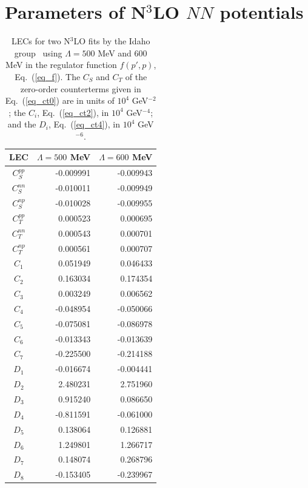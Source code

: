 \documentclass[sort&compress,preprint,3p]{elsarticle}
\begin{document}
\section{Parameters of N$^3$LO $NN$ potentials
\label{app_par}}

\setcounter{figure}{0}
\setcounter{table}{0}

\begin{table}[t]
\caption{LECs 
for two N$^3$LO fits by the Idaho group~\cite{EM03} using $\Lambda=500$ MeV
and 600 MeV in the regulator function $f(p',p)$, Eq.~(\ref{eq_f}).
The  $C_S$ and $C_T$ of the zero-order counterterms given in Eq.~(\ref{eq_ct0}) 
are in units of $10^4$ GeV$^{-2}$;
the $C_i$, Eq.~(\ref{eq_ct2}), in $10^4$ GeV$^{-4}$; 
and the $D_i$, Eq.~(\ref{eq_ct4}),
 in $10^4$ GeV$^{-6}$.
 \label{tab_LEC_ct1}}
 \smallskip
\begin{tabular*}{\textwidth}{@{\extracolsep{\fill}}crr}
\hline 
\hline 
\noalign{\smallskip}
 LEC & $\Lambda = 500$ MeV & $\Lambda =600$ MeV 
 \\
 \hline
  $C_S^{pp}$ & -0.009991  &  -0.009943 \\
 $C_S^{nn}$ & -0.010011  &  -0.009949 \\
$C_S^{np}$ & -0.010028  &  -0.009955 \\
$C_T^{pp}$ & 0.000523   &  0.000695 \\
$C_T^{nn}$ & 0.000543   &  0.000701 \\
$C_T^{np}$ & 0.000561   &  0.000707 \\
$C_1$ &   0.051949 &   0.046433 \\
$C_2$ & 0.163034  &  0.174354 \\
$C_3$ & 0.003249  &  0.006562 \\
$C_4$ & -0.048954 & -0.050066 \\
$C_5$ & -0.075081 &      -0.086978 \\
$C_6$ &   -0.013343 &  -0.013639 \\
$C_7$ & -0.225500 &  -0.214188 \\
$D_1$ &   -0.016674 & -0.004441 \\
$D_2$ &  2.480231 & 2.751960 \\
$D_3$ &    0.915240 & 0.086650 \\
$D_4$ &     -0.811591 &  -0.061000 \\
 $D_5$ &      0.138064 & 0.126881 \\
$D_6$ &    1.249801 & 1.266717  \\
$D_7$ &  0.148074 & 0.268796 \\
$D_8$ &   -0.153405 &      -0.239967 \\

\end{tabular*}
\end{table}
\end{document}
